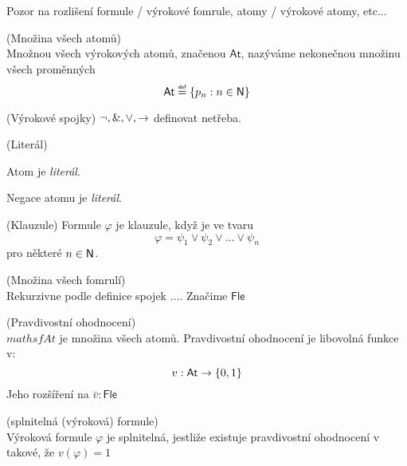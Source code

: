 


Pozor na rozlišení formule / výrokové fomrule, atomy / výrokové atomy, etc...

\begin{definition}{(Množina všech atomů)}\\
Množnou všech výrokových atomů, značenou $\mathsf{At}$, nazýváme nekonečnou množinu všech proměnných
\begin{equation}
\mathsf{At} \defeq \{p_n : n \in \sf{N}\}
\end{equation}
\end{definition}

\begin{definition}{(Výrokové spojky)}
$\neg, \mathrel{\&}, \lor, \rightarrow$ definovat netřeba.
\end{definition}

\begin{definition}{(Literál)}\\
\bce[(i)]
\item Atom je \emph{literál}.
\item Negace atomu je \emph{literál}.
\ece
\end{definition}

\begin{definition}{(Klauzule)}
Formule $\varphi$ je klauzule, když je ve tvaru
\begin{equation}
\varphi = \psi_1 \lor \psi_2 \lor \ldots \lor \psi_n 
\end{equation}
pro některé $n \in \sf{N}$.
\end{definition}

\begin{definition}{(Množina všech fomrulí)}\\
Rekurzivne podle definice spojek $\ldots$. Značime $\mathsf{Fle}$
\end{definition}

\begin{definition}{(Pravdivostní ohodnocení)}\\
$mathsf{At}$ je množina všech atomů. Pravdivostní ohodnocení je libovolná funkce v:
\begin{equation}
v : \mathsf{At} \rightarrow \{0, 1\}
\end{equation}
Jeho rozšíření na $\bar{v}: \mathsf{Fle}$ 
\end{definition}

\begin{definition}{(splnitelná (výroková) formule)}\\
Výroková formule $\varphi$ je splnitelná, jestliže existuje pravdivostní ohodnocení v takové, že $v(\varphi) = 1$
\end{definition}


